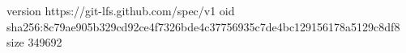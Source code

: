 version https://git-lfs.github.com/spec/v1
oid sha256:8c79ae905b329cd92ce4f7326bde4c37756935c7de4bc129156178a5129c8df8
size 349692
